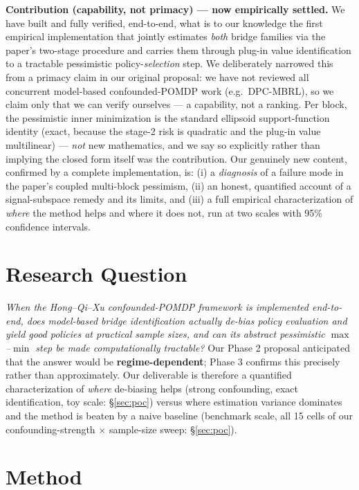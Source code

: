 \documentclass[11pt]{article}
\begin{document}
\textbf{Contribution (capability, not primacy) --- now empirically settled.} We have built
and fully verified, end-to-end, what is to our knowledge the first empirical
implementation that jointly estimates \emph{both} bridge families via the paper's
two-stage procedure and carries them through plug-in value identification to a tractable
pessimistic policy-\emph{selection} step. We deliberately narrowed this from a primacy
claim in our original proposal: we have not reviewed all concurrent model-based
confounded-POMDP work (e.g.\ DPC-MBRL), so we claim only that we can verify ourselves ---
a capability, not a ranking. Per block, the pessimistic inner minimization is the standard
ellipsoid support-function identity (exact, because the stage-2 risk is quadratic and the
plug-in value multilinear) --- \emph{not} new mathematics, and we say so explicitly rather
than implying the closed form itself was the contribution. Our genuinely new content,
confirmed by a complete implementation, is: (i) a \emph{diagnosis} of a failure mode in the
paper's coupled multi-block pessimism, (ii) an honest, quantified account of a
signal-subspace remedy and its limits, and (iii) a full empirical characterization of
\emph{where} the method helps and where it does not, run at two scales with 95\%
confidence intervals.

\section{Research Question}

\emph{When the Hong--Qi--Xu confounded-POMDP framework is implemented end-to-end, does
model-based bridge identification actually de-bias policy evaluation and yield good
policies at practical sample sizes, and can its abstract pessimistic $\max$--$\min$ step be
made computationally tractable?} Our Phase 2 proposal anticipated that the answer would be
\textbf{regime-dependent}; Phase 3 confirms this precisely rather than approximately. Our
deliverable is therefore a quantified characterization of \emph{where} de-biasing helps
(strong confounding, exact identification, toy scale: \S\ref{sec:poc}) versus where
estimation variance dominates and the method is beaten by a naive baseline (benchmark
scale, all 15 cells of our confounding-strength $\times$ sample-size sweep:
\S\ref{sec:poc}).

\section{Method}
\label{sec:method}
\end{document}
